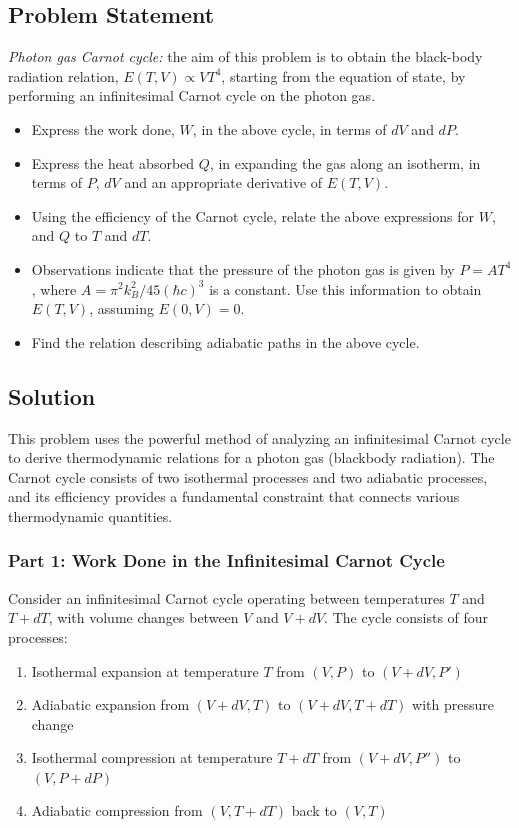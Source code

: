 \documentclass[10pt,twocoloumn]{article}
\begin{document}
\subsection*{Problem Statement}
\textit{Photon gas Carnot cycle:} the aim of this problem is to obtain the black-body radiation relation, $E(T,V)\propto VT^4$, starting from the equation of state, by performing an infinitesimal Carnot cycle on the photon gas.
\begin{itemize}
    \item Express the work done, $W$, in the above cycle, in terms of $dV$ and $dP$.
    \item Express the heat absorbed $Q$, in expanding the gas along an isotherm, in terms of $P$, $dV$ and an appropriate derivative of $E(T,V)$.
    \item Using the efficiency of the Carnot cycle, relate the above expressions for $W$, and $Q$ to $T$ and $dT$.
    \item Observations indicate that the pressure of the photon gas is given by $P=AT^4$, where $A = \pi^2 k_B^2 / 45(\hbar c)^3$ is a constant. Use this information to obtain $E(T,V)$, assuming  $E(0, V)=0$.
    \item Find the relation describing adiabatic paths in the above cycle.
\end{itemize}

\subsection*{Solution}

This problem uses the powerful method of analyzing an infinitesimal Carnot cycle to derive thermodynamic relations for a photon gas (blackbody radiation). The Carnot cycle consists of two isothermal processes and two adiabatic processes, and its efficiency provides a fundamental constraint that connects various thermodynamic quantities.

\subsubsection*{Part 1: Work Done in the Infinitesimal Carnot Cycle}

Consider an infinitesimal Carnot cycle operating between temperatures $T$ and $T + dT$, with volume changes between $V$ and $V + dV$. The cycle consists of four processes:

\begin{enumerate}
    \item Isothermal expansion at temperature $T$ from $(V, P)$ to $(V + dV, P')$
    \item Adiabatic expansion from $(V + dV, T)$ to $(V + dV, T + dT)$ with pressure change
    \item Isothermal compression at temperature $T + dT$ from $(V + dV, P'')$ to $(V, P + dP)$
    \item Adiabatic compression from $(V, T + dT)$ back to $(V, T)$
\end{enumerate}
\end{document}

